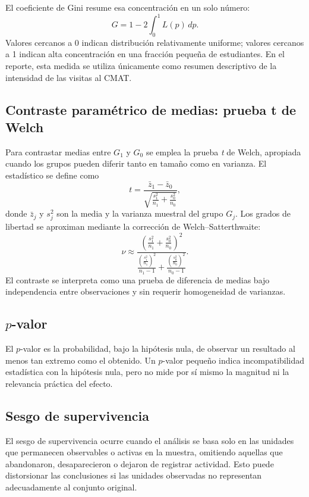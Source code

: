 \documentclass[10pt,letterpaper]{article} %
\numberwithin{figure}{subsection}
\begin{document}
El coeficiente de Gini resume esa concentración en un solo número:
\[
G = 1 - 2\int_0^1 L(p)\,dp.
\]
Valores cercanos a 0 indican distribución relativamente uniforme; valores cercanos a 1 indican alta concentración en una fracción pequeña de estudiantes. En el reporte, esta medida se utiliza únicamente como resumen descriptivo de la intensidad de las visitas al CMAT.

\subsection{Contraste paramétrico de medias: prueba t de Welch}
\label{apx:welch}
Para contrastar medias entre $G_1$ y $G_0$ se emplea la prueba \textit{t} de Welch, apropiada cuando los grupos pueden diferir tanto en tamaño como en varianza. El estadístico se define como
\[
t=\frac{\bar z_1-\bar z_0}{\sqrt{\frac{s_1^2}{n_1}+\frac{s_0^2}{n_0}}},
\]
donde $\bar z_j$ y $s_j^2$ son la media y la varianza muestral del grupo $G_j$. Los grados de libertad se aproximan mediante la corrección de Welch--Satterthwaite:
\[
\nu \approx
\frac{\left(\frac{s_1^2}{n_1}+\frac{s_0^2}{n_0}\right)^2}
{\frac{\left(\frac{s_1^2}{n_1}\right)^2}{n_1-1}+\frac{\left(\frac{s_0^2}{n_0}\right)^2}{n_0-1}}.
\]
El contraste se interpreta como una prueba de diferencia de medias bajo independencia entre observaciones y sin requerir homogeneidad de varianzas.

\subsection{\texorpdfstring{$p$-valor}{p-valor}}
\label{apx:p-value}
El $p$-valor es la probabilidad, bajo la hipótesis nula, de observar un resultado al menos tan extremo como el obtenido. Un $p$-valor pequeño indica incompatibilidad estadística con la hipótesis nula, pero no mide por sí mismo la magnitud ni la relevancia práctica del efecto.

\subsection{Sesgo de supervivencia}
\label{apx:survival-bias}
El sesgo de supervivencia ocurre cuando el análisis se basa solo en las unidades que permanecen observables o activas en la muestra, omitiendo aquellas que abandonaron, desaparecieron o dejaron de registrar actividad. Esto puede distorsionar las conclusiones si las unidades observadas no representan adecuadamente al conjunto original.
\end{document}
